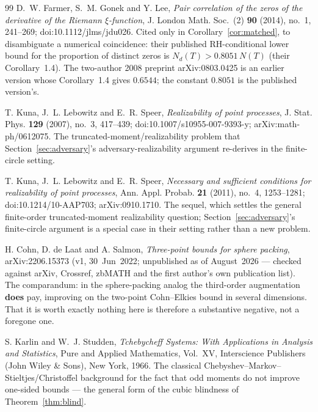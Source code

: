 \documentclass[11pt]{article}
\theoremstyle{plain}
\theoremstyle{definition}
\theoremstyle{remark}
\newcommand{\Nd}{N_{d}}
\begin{document}
\begin{thebibliography}{99}
 D.~W. Farmer, S.~M. Gonek and Y. Lee, \emph{Pair correlation
of the zeros of the derivative of the Riemann $\xi$-function}, J. London Math.
Soc.~(2) \textbf{90} (2014), no.~1, 241--269; doi:10.1112/jlms/jdu026. Cited only in
Corollary~\ref{cor:matched}, to disambiguate a numerical coincidence: their published
RH-conditional lower bound for the proportion of distinct zeros is
$\Nd(T) > 0.8051\,N(T)$ (their Corollary~1.4). The two-author 2008 preprint
arXiv:0803.0425 is an earlier version whose Corollary~1.4 gives $0.6544$; the constant
$0.8051$ is the published version's.

 T. Kuna, J.~L. Lebowitz and E.~R. Speer,
\emph{Realizability of point processes}, J. Stat. Phys. \textbf{129} (2007),
no.~3, 417--439; doi:10.1007/s10955-007-9393-y;
arXiv:math-ph/0612075. The truncated-moment/realizability problem that
Section~\ref{sec:adversary}'s adversary-realizability argument re-derives in the
finite-circle setting.

 T. Kuna, J.~L. Lebowitz and E.~R. Speer,
\emph{Necessary and sufficient conditions for realizability of point processes},
Ann. Appl. Probab. \textbf{21} (2011), no.~4, 1253--1281; doi:10.1214/10-AAP703;
arXiv:0910.1710. The sequel, which settles the general finite-order truncated-moment
realizability question; Section~\ref{sec:adversary}'s finite-circle argument is a
special case in their setting rather than a new problem.

 H. Cohn, D. de Laat and A. Salmon, \emph{Three-point
bounds for sphere packing}, arXiv:2206.15373 (v1, 30~Jun~2022; unpublished as of
August~2026 --- checked against arXiv, Crossref, zbMATH and the first author's own
publication list). The comparandum: in the
sphere-packing analog the third-order augmentation \textbf{does} pay, improving
on the two-point Cohn--Elkies bound in several dimensions. That it is worth
exactly nothing here is therefore a substantive negative, not a foregone one.

 S. Karlin and W.~J. Studden, \emph{Tchebycheff Systems:
With Applications in Analysis and Statistics}, Pure and Applied Mathematics,
Vol.~XV, Interscience Publishers (John Wiley \& Sons), New York, 1966. The
classical Chebyshev--Markov--Stieltjes/Christoffel background for the fact that
odd moments do not improve one-sided bounds --- the general form of the cubic
blindness of Theorem~\ref{thm:blind}.

\end{thebibliography}
\end{document}
